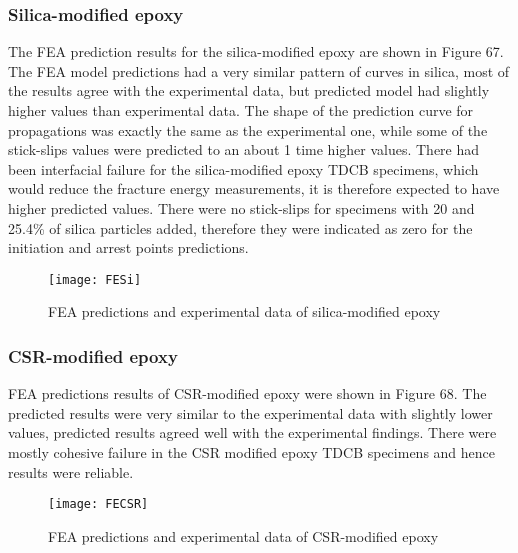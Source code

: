 \documentclass[numbers=noendperiod,chapterprefix=on]{icldt} %
\begin{document}
\subsubsection{Silica-modified epoxy}
The FEA prediction results for the silica-modified epoxy are shown in Figure 67. The FEA model predictions had a very similar pattern of curves in silica, most of the results agree with the experimental data, but predicted model had slightly higher values than experimental data. The shape of the prediction curve for propagations was exactly the same as the experimental one, while some of the stick-slips values were predicted to an about 1 time higher values. There had been interfacial failure for the silica-modified epoxy TDCB specimens, which would reduce the fracture energy measurements, it is therefore expected to have higher predicted values. There were no stick-slips for specimens with 20 and 25.4\% of silica particles added, therefore they were indicated as zero for the initiation and arrest points predictions. 

\begin{figure}[!hp]
\centering
\texttt{[image: FESi]}
\caption{FEA predictions and experimental data of silica-modified epoxy }
\end{figure}

\subsubsection{CSR-modified epoxy}
FEA predictions results of CSR-modified epoxy were shown in Figure 68. The predicted results were very similar to the experimental data with slightly lower values, predicted results agreed well with the experimental findings. There were mostly cohesive failure in the CSR modified epoxy TDCB specimens and hence results were reliable. 

\begin{figure}[!hp]
\centering
\texttt{[image: FECSR]}
\caption{FEA predictions and experimental data of CSR-modified epoxy }
\end{figure}
\end{document}
